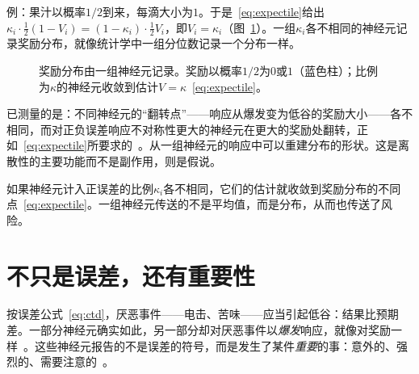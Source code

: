 例：果汁以概率$1/2$到来，每滴大小为$1$。于是~\eqref{eq:expectile}给出$\kappa_i\cdot\tfrac12(1-V_i)=(1-\kappa_i)\cdot\tfrac12V_i$，即$V_i=\kappa_i$（图~\ref{fig:expectiles}）。一组$\kappa_i$各不相同的神经元记录奖励分布，就像统计学中一组分位数记录一个分布一样。

\begin{figure}[t]
\centering
{}
\caption{奖励分布由一组神经元记录。奖励以概率$1/2$为$0$或$1$（蓝色柱）；比例为$\kappa$的神经元收敛到估计$V=\kappa$~\eqref{eq:expectile}。}
\label{fig:expectiles}
\end{figure}

已测量的是：不同神经元的“翻转点”——响应从爆发变为低谷的奖励大小——各不相同，而对正负误差响应不对称性更大的神经元在更大的奖励处翻转，正如~\eqref{eq:expectile}所要求的~\cite{Dabney2020}。从一组神经元的响应中可以重建分布的形状。这是离散性的主要功能而不是副作用，则是假说。

\begin{keyblock}
\begin{proposition}[由不对称得到分布]
\label{prop:expectile}
如果神经元计入正误差的比例$\kappa_i$各不相同，它们的估计就收敛到奖励分布的不同点~\eqref{eq:expectile}。一组神经元传送的不是平均值，而是分布，从而也传送了风险。
\end{proposition}
\end{keyblock}

\section{不只是误差，还有重要性}

按误差公式~\eqref{eq:ctd}，厌恶事件——电击、苦味——应当引起低谷：结果比预期差。一部分神经元确实如此，另一部分却对厌恶事件以\emph{爆发}响应，就像对奖励一样~\cite{Matsumoto2009}。这些神经元报告的不是误差的符号，而是发生了某件\emph{重要}的事：意外的、强烈的、需要注意的~\cite{BrombergMartin2010}。

